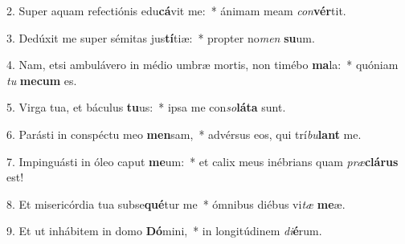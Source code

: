 2. Super aquam refectiónis edu\textbf{cá}vit me:~*  ánimam meam \textit{con}\textbf{vér}tit.\

3. Dedúxit me super sémitas jus\textbf{tí}tiæ:~*  propter no\textit{men} \textbf{su}um.\

4. Nam, etsi ambulávero in médio umbræ mortis, non timébo \textbf{ma}la:~*  quóniam \textit{tu} \textbf{me}\textbf{cum} es.\

5. Virga tua, et báculus \textbf{tu}us:~*  ipsa me con\textit{so}\textbf{lá}\textbf{ta} sunt.\

6. Parásti in conspéctu meo \textbf{men}sam,~*  advérsus eos, qui trí\textit{bu}\textbf{lant} me.\

7. Impinguásti in óleo caput \textbf{me}um:~*  et calix meus inébrians quam \textit{præ}\textbf{clá}\textbf{rus} est!\

8. Et misericórdia tua subse\textbf{qué}tur me~*  ómnibus diébus vi\textit{tæ} \textbf{me}æ.\

9. Et ut inhábitem in domo \textbf{Dó}mini,~*  in longitúdinem \textit{di}\textbf{é}rum.\

